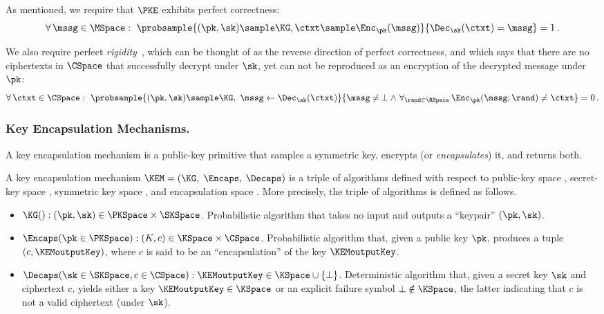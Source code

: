      As mentioned, we require that $\PKE$ exhibits perfect correctness:
      \[
        \forall\, \mssg\in\MSpace:\ \probsample{
          (\pk,\sk) \sample \KG, \ctxt \sample \Enc_\pk(\mssg)
        }{
          \Dec_\sk(\ctxt) = \mssg
        } = 1\, .
      \]

      \noindent
      We also require perfect
      \emph{rigidity}~\cite{EPRINT:BerPer18,EC:HHMS25}, which can be thought of
      as the reverse direction of perfect correctness,
      and which says that there are no ciphertexts in $\CSpace$ that successfully decrypt
      under $\sk$, yet can not be reproduced as an encryption of the decrypted
      message under $\pk$:
      \[
        \forall\, \ctxt\in\CSpace:\ \probsample{
          (\pk,\sk) \sample \KG,\ \mssg \gets \Dec_\sk(\ctxt)
        }{
          \mssg \neq\, \perp \land\
          \forall_{\rand\in\RSpace}\, \Enc_\pk(\mssg; \rand) \neq \ctxt
        } = 0\, .
      \]

    \subsubsection{Key Encapsulation Mechanisms.}
      A key encapsulation mechanism is a public-key primitive that samples a
        symmetric key, encrypts (or \emph{encapsulates}) it, and returns both.

	    \begin{definition}\label{def:KEM}
	    	A key encapsulation mechanism $\KEM = (\KG,$ $\Encaps,$ $\Decaps)$ is a triple of algorithms
	    	defined with respect to public-key space \PKSpace, secret-key space \SKSpace,
	    	symmetric key space \KSpace, and encapsulation space \CSpace.
	    	More precisely, the triple of algorithms is defined as follows.
	    	\begin{itemize}
	    		\item
	    			$\KG() : (\pk, \sk) \in \PKSpace \times \SKSpace$.
	    			Probabilistic algorithm that takes no input and outputs a ``keypair'' $(\pk, \sk)$.
	    		\item
	    			$\Encaps(\pk \in \PKSpace) : (K, c) \in \KSpace \times \CSpace$.
	    			Probabilistic algorithm that, given a public key $\pk$,
	    			produces a tuple $(c,\KEMoutputKey)$,
	    			where $c$ is said to be an ``encapsulation'' of the key $\KEMoutputKey$.
	    		\item
	    			$\Decaps(\sk \in \SKSpace, c \in \CSpace) : \KEMoutputKey \in \KSpace \cup \{\bot\}$.
	    			Deterministic algorithm that, given a secret key $\sk$ and ciphertext $c$,
	    			yields either a key $\KEMoutputKey \in \KSpace$ or an explicit failure symbol $\bot \notin \KSpace$,
	    			the latter indicating that $c$ is not a valid ciphertext (under $\sk$).
	    	\end{itemize}
	    \end{definition}

